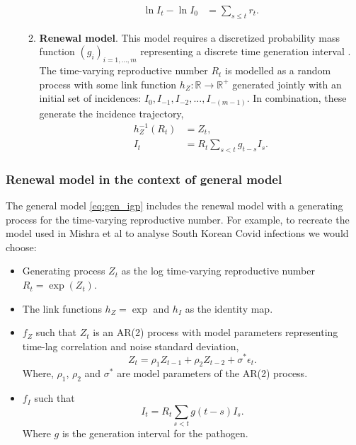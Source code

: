 \documentclass{getwriting}
\begin{document}
\begin{itemize}
\begin{enumerate}
\begin{equation}
\begin{split}
                 \ln I_t - \ln I_0 &= \sum_{s \leq t} r_t.
             \end{split}
         \end{equation}
	\item \textbf{Renewal model}. This model requires a discretized probability mass function $(g_i)_{i=1,\dots,m}$ representing a discrete time generation interval \cite{fraser2007estimating}. The time-varying reproductive number $R_t$ is modelled as a random process with some link function $h_Z: \mathbb{R} \to \mathbb{R}^{+}$ generated jointly with an initial set of incidences: $I_0, I_{-1}, I_{-2},...,I_{-(m-1)}$. In combination, these generate the incidence trajectory,
        \begin{equation}
            \begin{split}
                h_Z^{-1}(R_t) &= Z_t, \\
                I_t &= R_t \sum_{s < t} g_{t-s} I_s. 
            \end{split}
        \end{equation}
    \end{enumerate}    
\end{itemize}



\subsubsection{Renewal model in the context of general model}
The general model \ref{eq:gen_igp} includes the renewal model with a generating process for the time-varying reproductive number. For example, to recreate the model used in Mishra et al \cite{mishra_derivation_2020} to analyse South Korean Covid infections we would choose:
\begin{itemize}
\item Generating process $Z_t$ as the log time-varying reproductive number $R_t = \exp(Z_t)$.
\item The link functions $h_Z = \exp$ and $h_I$ as the identity map.
\item $f_Z$ such that $Z_t$ is an AR(2) process with model parameters representing time-lag correlation and noise standard deviation,
    \begin{equation}
        Z_t = \rho_1 Z_{t-1} + \rho_2 Z_{t-2} + \sigma^* \epsilon_t.
    \end{equation}
Where, $\rho_1$, $\rho_2$ and $\sigma^*$ are model parameters of the AR(2) process.
\item $f_I$ such that 
    \begin{equation}
        I_t = R_t \sum_{s < t} g(t-s) I_s.
    \end{equation}
    Where $g$ is the generation interval for the pathogen. 
\end{itemize}
\end{document}
